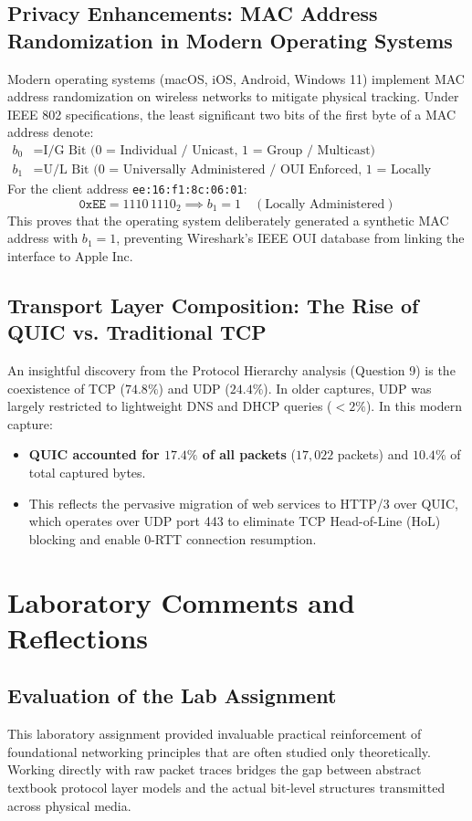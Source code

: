 \documentclass[11pt,a4paper]{article}
\begin{document}
\subsection{Privacy Enhancements: MAC Address Randomization in Modern Operating Systems}
Modern operating systems (macOS, iOS, Android, Windows 11) implement MAC address randomization on wireless networks to mitigate physical tracking.
Under IEEE 802 specifications, the least significant two bits of the first byte of a MAC address denote:
\begin{align*}
    b_0 &= \text{I/G Bit (0 = Individual / Unicast, 1 = Group / Multicast)} \\
    b_1 &= \text{U/L Bit (0 = Universally Administered / OUI Enforced, 1 = Locally Administered)}
\end{align*}
For the client address \texttt{ee:16:f1:8c:06:01}:
$$\texttt{0xEE} = 1110\,1110_2 \implies b_1 = 1 \quad (\text{Locally Administered})$$
This proves that the operating system deliberately generated a synthetic MAC address with $b_1 = 1$, preventing Wireshark's IEEE OUI database from linking the interface to Apple Inc.

\subsection{Transport Layer Composition: The Rise of QUIC vs. Traditional TCP}
An insightful discovery from the Protocol Hierarchy analysis (Question 9) is the coexistence of TCP ($74.8\%$) and UDP ($24.4\%$). In older captures, UDP was largely restricted to lightweight DNS and DHCP queries ($< 2\%$). In this modern capture:
\begin{itemize}[leftmargin=*]
    \item \textbf{QUIC accounted for $17.4\%$ of all packets} ($17,022$ packets) and $10.4\%$ of total captured bytes.
    \item This reflects the pervasive migration of web services to HTTP/3 over QUIC, which operates over UDP port 443 to eliminate TCP Head-of-Line (HoL) blocking and enable 0-RTT connection resumption.
\end{itemize}

\section{Laboratory Comments and Reflections}

\subsection{Evaluation of the Lab Assignment}
This laboratory assignment provided invaluable practical reinforcement of foundational networking principles that are often studied only theoretically. Working directly with raw packet traces bridges the gap between abstract textbook protocol layer models and the actual bit-level structures transmitted across physical media.
\end{document}
